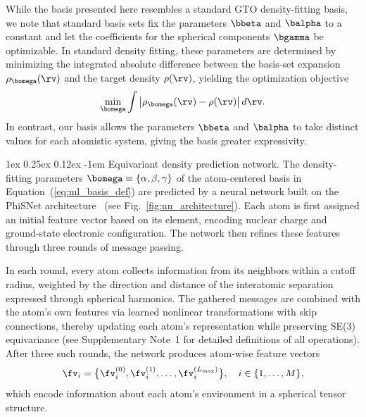 \documentclass[12pt]{article}
\makeatletter
\renewcommand\paragraph{\@startsection{paragraph}{4}{\parindent}%
  {1ex \@plus 0.25ex \@minus 0.12ex}%
  {-1em}%
  {\normalfont\normalsize\itshape}}
\makeatother
\begin{document}
While the basis presented here resembles a standard GTO density-fitting basis, we note that standard basis sets fix the parameters $\bbeta$ and $\balpha$ to a constant and let the coefficients for the spherical components $\bgamma$ be optimizable. In standard density fitting, these parameters are determined by minimizing the integrated absolute difference between the basis-set expansion $\rho_{\bomega}(\rv)$ and the target density $\rho(\rv)$, yielding the optimization objective
\begin{equation}\label{eq:int_dens_diff}
  \min\limits_{\bomega} \int\left|\rho_{\bomega}(\rv) - \rho(\rv)\right|d\rv.
\end{equation}
In contrast, our basis allows the parameters $\bbeta$ and $\balpha$ to take distinct values for each atomistic system, giving the basis greater expressivity. 

\paragraph{Equivariant density prediction network.}\label{sec:den_pred_net}
The density-fitting parameters
$\bomega \equiv \{\alpha,\beta,\gamma\}$ of the atom-centered basis in Equation~(\ref{eq:ml_basis_def}) are predicted by a neural network built on the PhiSNet architecture~\citep{unke2021se} 
(see Fig.~\ref{fig:nn_architecture}).
Each atom is first assigned an initial feature vector based on its element, encoding nuclear charge and ground-state electronic configuration.
The network then refines these features through three rounds of message passing.

In each round, every atom collects information from its neighbors within a cutoff radius, weighted by the direction and distance of the interatomic separation expressed through spherical harmonics. The gathered messages are combined with the atom's own features via learned nonlinear transformations with skip connections, thereby updating each atom's representation while preserving SE(3) equivariance (see Supplementary Note~1 for detailed definitions of all operations).
After three such rounds, the network produces atom-wise feature vectors
\begin{equation}\label{eq:beta_coeffs}
  \fv_i = \bigl\{\fv_i^{(0)}, \fv_i^{(1)}, \ldots, \fv_i^{(L_{\max})}\bigr\}, \quad i \in \{1,\ldots,M\},
\end{equation}
which encode information about each atom's environment in a spherical tensor structure.
\end{document}
